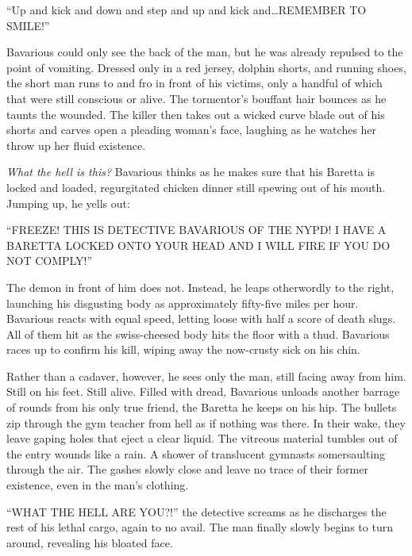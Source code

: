 ``Up and kick and down and step and up and kick
and{\ldots}REMEMBER TO SMILE!''



Bavarious could only see the back of the man, but he was already
repulsed to the point of vomiting. Dressed only in a red jersey,
dolphin shorts, and running shoes, the short man runs to and fro in
front of his victims, only a handful of which that were still
conscious or alive. The tormentor's bouffant hair bounces as
he taunts the wounded. The killer then takes out a wicked curve
blade out of his shorts and carves open a pleading woman's
face, laughing as he watches her throw up her fluid
existence.



{\em What the hell is this?} Bavarious thinks as he makes sure
that his Baretta is locked and loaded, regurgitated chicken dinner
still spewing out of his mouth. Jumping up, he yells out:



``FREEZE! THIS IS DETECTIVE BAVARIOUS OF THE NYPD! I HAVE A
BARETTA LOCKED ONTO YOUR HEAD AND I WILL FIRE IF YOU DO NOT
COMPLY!''



The demon in front of him does not. Instead, he leaps otherwordly
to the right, launching his disgusting body as approximately
fifty-five miles per hour. Bavarious reacts with equal speed,
letting loose with half a score of death slugs. All of them hit as
the swiss-cheesed body hits the floor with a thud. Bavarious races
up to confirm his kill, wiping away the now-crusty sick on his
chin.



Rather than a cadaver, however, he sees only the man, still facing
away from him. Still on his feet. Still alive. Filled with dread,
Bavarious unloads another barrage of rounds from his only true
friend, the Baretta he keeps on his hip. The bullets zip through
the gym teacher from hell as if nothing was there. In their wake,
they leave gaping holes that eject a clear liquid. The vitreous
material tumbles out of the entry wounds like a rain. A shower of
translucent gymnasts somersaulting through the air. The gashes
slowly close and leave no trace of their former existence, even in
the man's clothing.



``WHAT THE HELL ARE YOU?!'' the detective screams as he
discharges the rest of his lethal cargo, again to no avail. The man
finally slowly begins to turn around, revealing his bloated
face.



